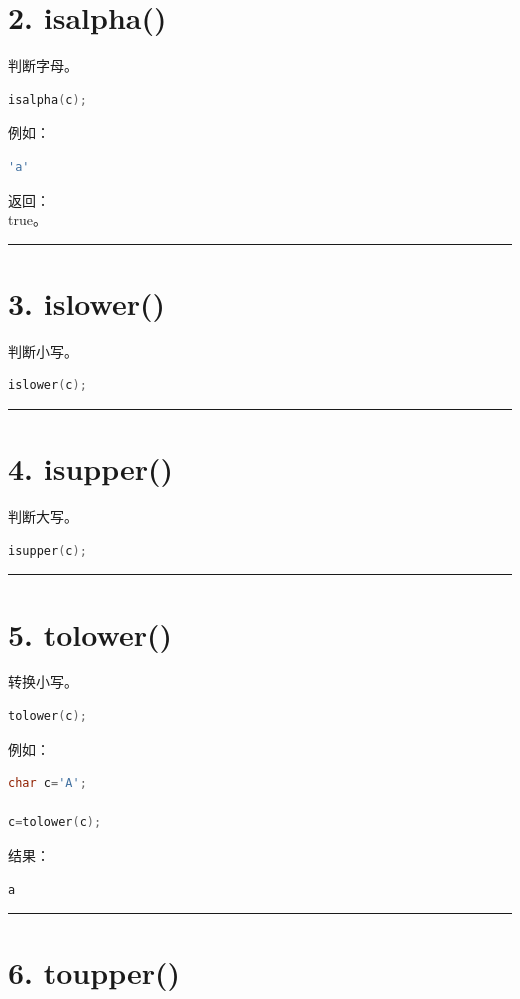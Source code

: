 \documentclass[10pt,twocolumn]{extarticle}
\begin{document}
\section{2. isalpha()}

判断字母。
\begin{lstlisting}[language=C++]
isalpha(c);
\end{lstlisting}
例如：
\begin{lstlisting}[language=C++]
'a'
\end{lstlisting}
返回：\\
true。

\noindent\rule{\linewidth}{0.4pt}

\section{3. islower()}

判断小写。
\begin{lstlisting}[language=C++]
islower(c);
\end{lstlisting}

\noindent\rule{\linewidth}{0.4pt}

\section{4. isupper()}

判断大写。
\begin{lstlisting}[language=C++]
isupper(c);
\end{lstlisting}

\noindent\rule{\linewidth}{0.4pt}

\section{5. tolower()}

转换小写。
\begin{lstlisting}[language=C++]
tolower(c);
\end{lstlisting}
例如：
\begin{lstlisting}[language=C++]
char c='A';

c=tolower(c);
\end{lstlisting}
结果：
\begin{lstlisting}
a
\end{lstlisting}

\noindent\rule{\linewidth}{0.4pt}

\section{6. toupper()}
\end{document}
